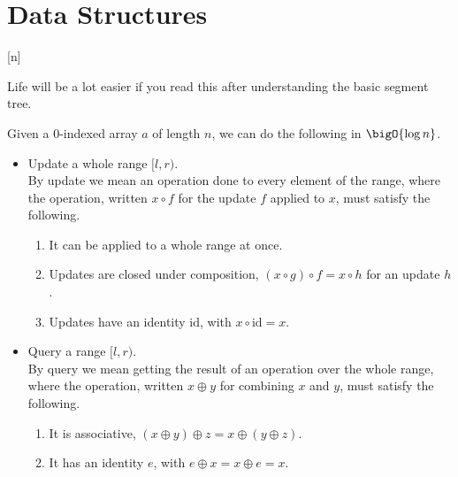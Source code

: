 \section{Data Structures}

[\log n]

{\small\leavevmode\color{muted} Life will be a lot easier if you read this after understanding the basic segment tree.\par}

\begin{problem}
Given a 0-indexed array \(a\) of length \(n\), we can do the following in \(\bigO{\log n}\).
\begin{itemize}
\item Update a whole range \([l, r)\). \\
By update we mean an operation done to every element of the range, where the operation, written \(x \circ f\) for the update \(f\) applied to \(x\), must satisfy the following.
\begin{enumerate}[label=\textup{(U\arabic*)},leftmargin=*]
\item It can be applied to a whole range at once.
\item Updates are closed under composition, \((x \circ g) \circ f = x \circ h\) for an update \(h\).
\item Updates have an identity \(\mathrm{id}\), with \(x \circ \mathrm{id} = x\).
\end{enumerate}
\item Query a range \([l, r)\). \\
By query we mean getting the result of an operation over the whole range, where the operation, written \(x \oplus y\) for combining \(x\) and \(y\), must satisfy the following.
\begin{enumerate}[label=\textup{(Q\arabic*)},leftmargin=*]
\item It is associative, \((x \oplus y) \oplus z = x \oplus (y \oplus z)\).
\item It has an identity \(e\), with \(e \oplus x = x \oplus e = x\).
\end{enumerate}
\end{itemize}
\end{problem}

